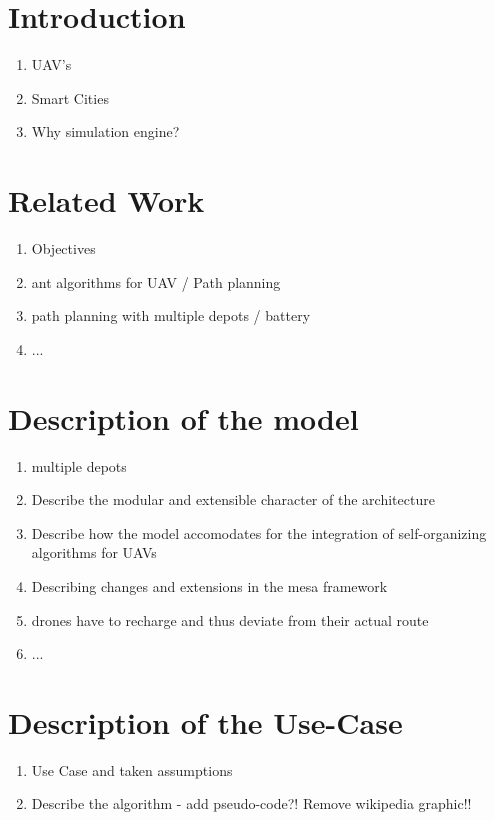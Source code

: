 \section{Introduction}
\begin{enumerate}
	\item UAV's
	\item Smart Cities
	\item Why simulation engine?
\end{enumerate}

\section{Related Work}
\begin{enumerate}
	\item Objectives
	\item ant algorithms for UAV / Path planning
	\item path planning with multiple depots / battery
	\item ...
\end{enumerate}

\section{Description of the model}
\begin{enumerate}
	\item multiple depots
	\item Describe the modular and extensible character of the architecture
	\item Describe how the model accomodates for the integration of self-organizing algorithms for UAVs
	\item Describing changes and extensions in the mesa framework
	\item drones have to recharge and thus deviate from their actual route
	\item ...
	
\end{enumerate}

\section{Description of the Use-Case}

\begin{enumerate}
	\item Use Case and taken assumptions
	\item Describe the algorithm - add pseudo-code?! Remove wikipedia graphic!!
\end{enumerate}

